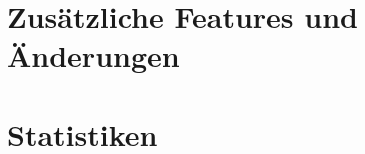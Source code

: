 \documentclass[parskip=full,11pt,twoside]{scrartcl}
\begin{document}
\section{Zusätzliche Features und Änderungen}


\section{Statistiken}

\end{document}
